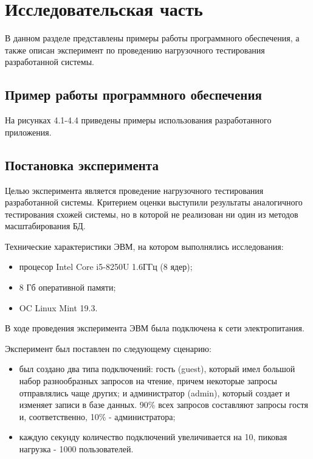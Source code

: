 \chapter{Исследовательская часть}

В данном разделе представлены примеры работы программного обеспечения, а также описан эксперимент по проведению нагрузочного тестирования разработанной системы.


\section{Пример работы программного обеспечения}

На рисунках 4.1-4.4 приведены примеры использования разработанного приложения.




\section{Постановка эксперимента}

Целью эксперимента является проведение нагрузочного тестирования разработанной системы. Критерием оценки выступили результаты аналогичного тестирования схожей системы, но в которой не реализован ни один из методов масштабирования БД.


Технические характеристики ЭВМ, на котором выполнялись исследования:
\begin{itemize}
	\item процесор Intel Core i5-8250U 1.6ГГц (8 ядер);
	\item 8 Гб оперативной памяти;
	\item OC Linux Mint 19.3.
\end{itemize}
В ходе проведения эксперимента ЭВМ была подключена к сети электропитания.


Эксперимент был поставлен по следующему сценарию:
\begin{itemize}
	\item был создано два типа подключений: гость (guest), который имел большой набор разнообразных запросов на чтение, причем некоторые запросы отправлялись чаще других; и администратор (admin), который создает и изменяет записи в базе данных. 90\% всех запросов составляют запросы гостя и, соответственно, 10\% - администратора;
 	\item каждую секунду количество подключений увеличивается на 10, пиковая нагрузка - 1000 пользователей.
\end{itemize}


